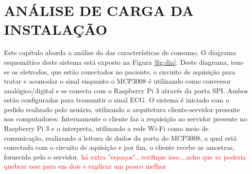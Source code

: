 \section{ANÁLISE DE CARGA DA INSTALAÇÃO}

\hspace*{0.8cm} Este capítulo aborda a análise do das características de consumo. O diagrama esquemático deste sistema está exposto na  Figura \ref{fig:dia}. Deste diagrama, tem-se os eletrodos, que estão conectados no paciente; o cir\-cuito de aquisição para tratar e acomodar o sinal enquanto o MCP3008 é utilizando como conversor analógico/digital e se conecta com o Raspberry Pi 3 através da porta SPI. Ambos estão configurados para transmitir o sinal ECG. O sistema é iniciado com o pedido realizado pelo usuário, utilizando a arquitetura cliente-servidor presente nos computadores. Internamente o cliente
faz a requisição ao servidor presente no Raspberry Pi 3 e o interpreta, utilizando a rede Wi-Fi como meio de comunicação, realizando a leitura de dados da porta do MCP3008, a qual está conectada com o circuito de aquisição e por fim, o cliente recebe as amostras, fornecida pelo o servidor. \textcolor{red}{há extra "espaços"...verifique isso....acho que vc poderia quebrar esse para em dois e explicar um pouco melhor}


